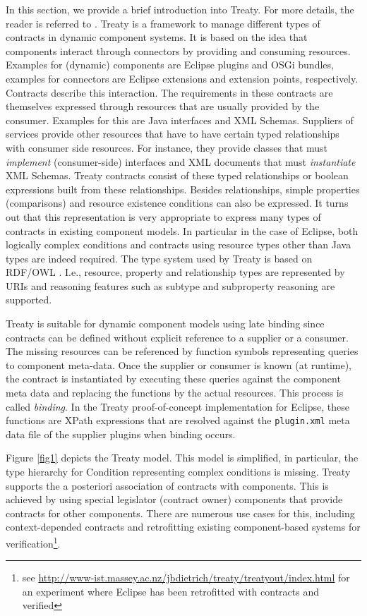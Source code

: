 \documentclass{llncs}
\begin{document}
In this section, we provide a brief introduction into Treaty. For more details, the reader is referred to \cite{Treaty.JOT2009}. Treaty is a framework to manage different types of contracts in dynamic component systems. It is based on the idea 
that components interact through connectors by providing and consuming resources. Examples for (dynamic) components are Eclipse plugins and OSGi bundles, examples for connectors are Eclipse extensions and extension points, respectively. Contracts describe this interaction. The requirements in these contracts are themselves expressed through resources that are usually provided by the consumer. Examples for this
are Java interfaces and XML Schemas. Suppliers of services provide other resources that have to have certain typed relationships with consumer side resources. For instance, they provide classes that must \textit{implement} (consumer-side) 
interfaces and XML documents that must \textit{instantiate} XML Schemas. Treaty contracts consist of these typed relationships or boolean expressions built from these relationships. Besides relationships, simple properties (comparisons) and 
resource existence conditions can also be expressed. It turns out that this representation is very appropriate to express many types of contracts in existing component models. In particular in the case of Eclipse,  both logically complex conditions and contracts using resource types other than Java types are indeed required. The type system used by Treaty is based on RDF/OWL \cite{RDF,OWL}. I.e., resource, property and relationship types are represented by URIs and reasoning features such as subtype and subproperty reasoning are supported. 

Treaty is suitable for dynamic component models using late binding since contracts can be defined without explicit reference to a supplier or a consumer. The missing resources can be referenced by function symbols representing 
queries to component meta-data. Once the supplier or consumer is known (at runtime), the contract is instantiated by executing these queries against the component meta data and replacing the functions by the actual resources. 
This process is called \textit{binding}. In the Treaty proof-of-concept implementation for Eclipse, these functions are XPath expressions that are resolved against the \texttt{plugin.xml} meta data file of the supplier plugins when 
binding occurs. 

Figure \ref{fig1} depicts the Treaty model. This model is simplified, in particular, the type hierarchy for Condition representing complex conditions is missing. Treaty supports the a posteriori association of contracts with components. 
This is achieved by using special legislator (contract owner) components that provide contracts for other components.  There are numerous use cases for this, including context-depended contracts and retrofitting existing component-based systems for verification\footnote{see \url{http://www-ist.massey.ac.nz/jbdietrich/treaty/treatyout/index.html} for an experiment where Eclipse has been retrofitted with contracts and verified}. 
\end{document}
